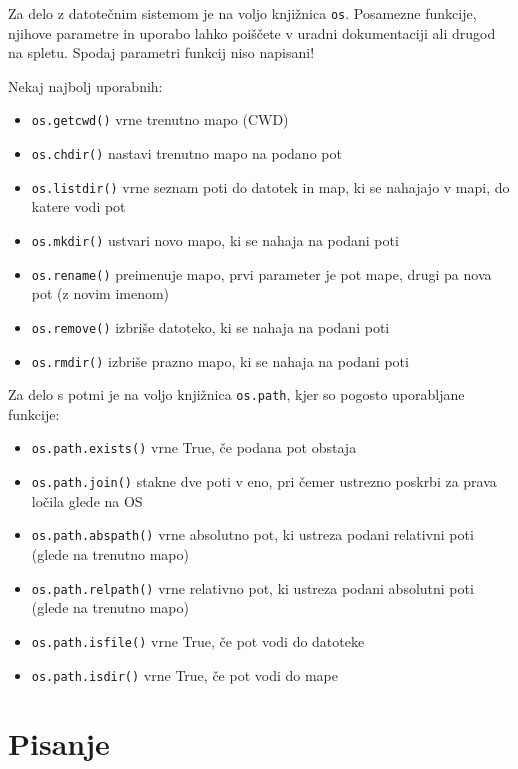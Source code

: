 \documentclass[
]{book}
\providecommand{\tightlist}{%
  \setlength{\itemsep}{0pt}\setlength{\parskip}{0pt}}
\begin{document}
Za delo z datotečnim sistemom je na voljo knjižnica \texttt{os}.
Posamezne funkcije, njihove parametre in uporabo lahko poiščete v uradni
dokumentaciji ali drugod na spletu. Spodaj parametri funkcij niso napisani!

Nekaj najbolj uporabnih:

\begin{itemize}
\tightlist
\item
  \texttt{os.getcwd()} vrne trenutno mapo (CWD)
\item
  \texttt{os.chdir()} nastavi trenutno mapo na podano pot
\item
  \texttt{os.listdir()} vrne seznam poti do datotek in map, ki se nahajajo v mapi, do katere vodi pot
\item
  \texttt{os.mkdir()} ustvari novo mapo, ki se nahaja na podani poti
\item
  \texttt{os.rename()} preimenuje mapo, prvi parameter je pot mape, drugi pa nova pot (z novim imenom)
\item
  \texttt{os.remove()} izbriše datoteko, ki se nahaja na podani poti
\item
  \texttt{os.rmdir()} izbriše prazno mapo, ki se nahaja na podani poti
\end{itemize}

Za delo s potmi je na voljo knjižnica \texttt{os.path}, kjer so pogosto uporabljane funkcije:

\begin{itemize}
\tightlist
\item
  \texttt{os.path.exists()} vrne True, če podana pot obstaja
\item
  \texttt{os.path.join()} stakne dve poti v eno, pri čemer ustrezno poskrbi za prava ločila glede na OS
\item
  \texttt{os.path.abspath()} vrne absolutno pot, ki ustreza podani relativni poti (glede na trenutno mapo)
\item
  \texttt{os.path.relpath()} vrne relativno pot, ki ustreza podani absolutni poti (glede na trenutno mapo)
\item
  \texttt{os.path.isfile()} vrne True, če pot vodi do datoteke
\item
  \texttt{os.path.isdir()} vrne True, če pot vodi do mape
\end{itemize}

\hypertarget{pisanje}{%
\section{Pisanje}\label{pisanje}}
\end{document}
